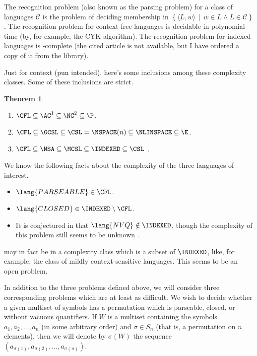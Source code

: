 \documentclass[draft]{article}
\newtheorem{theorem}{Theorem}
\theoremstyle{remark} \newtheorem{technicality}{Technical note}
\theoremstyle{definition} \newtheorem{definition}{Definition}
\newcommand{\pair}[2]{\langle#1,#2\rangle} %
\newcommand{\lb}{\left\{} %
\newcommand{\rb}{\right\}} %
\newcommand{\st}{\,\middle|\,} %
\begin{document}
The recognition problem (also known as the parsing problem) for a class of languages $\mathcal{C}$ is the problem of deciding membership in $\lb\pair{L}{w}\st w\in L \land L\in\mathcal{C} \rb$.
The recognition problem for context-free languages is decidable in polynomial time (by, for example, the CYK algorithm).
The recognition problem for indexed languages is \EXP-complete \cite{tk86} (the cited article is not available, but I have ordered a copy of it from the library).

Just for context (pun intended), here's some inclusions among these complexity classes.
Some of these inclusions are strict.
\begin{theorem}\mbox{}
  \begin{enumerate}
  \item $\CFL\subseteq\AC^1\subseteq\NC^2\subseteq\P$.
  \item $\CFL\subseteq\GCSL\subseteq\CSL=\NSPACE(n)\subseteq\NLINSPACE\subseteq\E$.
  \item $\CFL\subseteq\NSA\subseteq\MCSL\subseteq\INDEXED\subseteq\CSL$ \cite{hu79}.
  \end{enumerate}
\end{theorem}

We know the following facts about the complexity of the three languages of interest.
\begin{itemize}
\item $\lang{PARSEABLE}\in\CFL$.
\item $\lang{CLOSED}\in\INDEXED\setminus\CFL$. \cite{mp84}
\item It is conjectured in \cite{mp84} that $\lang{NVQ}\notin\INDEXED$, though the complexity of this problem still seems to be unknown \cite{potts}.
\end{itemize}
 may in fact be in a complexity class which is a subset of $\INDEXED$, like, for example, the class of mildly context-sensitive languages.
This seems to be an open problem.

In addition to the three problems defined above, we will consider three corresponding problems which are at least as difficult.
We wish to decide whether a given multiset of symbols has a permutation which is parseable, closed, or without vacuous quantifiers.
If $W$ is a multiset containing the symbols $a_1, a_2, \ldots, a_n$ (in some arbitrary order) and $\sigma\in S_n$ (that is, a permutation on $n$ elements), then we will denote by $\sigma(W)$ the sequence $(a_{\sigma(1)}, a_{\sigma(2)}, \ldots, a_{\sigma(n)})$.
\end{document}
